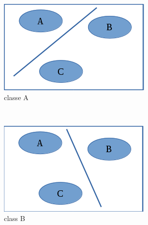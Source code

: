 \begin{figure}[H]
        \centering
        \begin{subfigure}[b]{0.3\textwidth}
                \includegraphics[width=\textwidth]{images/classa}
                \caption{classe A}
                \label{classa}
        \end{subfigure}%
        ~ %
        \begin{subfigure}[b]{0.3\textwidth}
                \includegraphics[width=\textwidth]{images/classb}
                \caption{class B}
                \label{classb}
        \end{subfigure}
        ~ %
        \begin{subfigure}[b]{0.30\textwidth}

\end{subfigure}
\end{figure}
